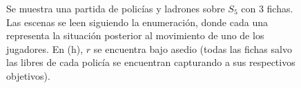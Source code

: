 \begin{figure}[!htbp]
\begin{tcbitemize}
{
                    }
    \end{tcbitemize}
    \captionsetup{font=footnotesize}
    \caption{Se muestra una partida de polic\'ias y ladrones sobre $S_5$ con $3$
    fichas. Las escenas se leen siguiendo la enumeraci\'on, donde cada una
    representa la situaci\'on posterior al movimiento de uno de los jugadores.
    En (h), $r$ se encuentra bajo asedio (todas las fichas salvo las libres de
    cada polic\'ia se encuentran capturando a sus respectivos objetivos).}
    \label{fig:partida1}
\end{figure}

